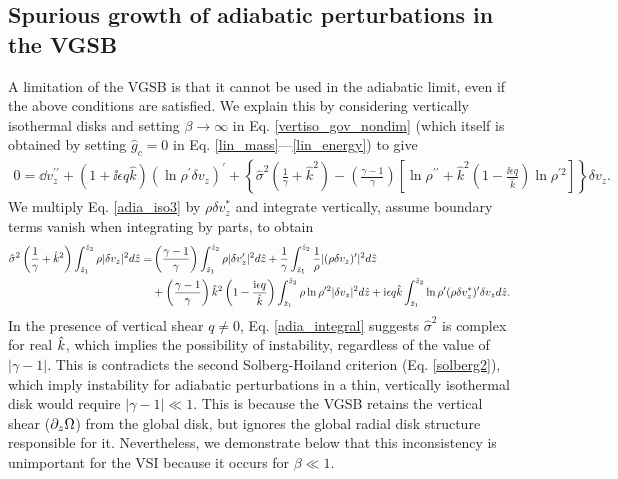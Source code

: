 \subsection{Spurious growth of adiabatic perturbations in the VGSB}\label{analytic_adia} 
A limitation of the VGSB is that it cannot be used in the
adiabatic limit, even if the above conditions are satisfied. We explain this by considering vertically isothermal
disks and setting  $\beta\to\infty$ in 
Eq. \ref{vertiso_gov_nondim} (which itself is obtained by setting
$\hat{g}_c=0$ in Eq. \ref{lin_mass}---\ref{lin_energy}) to give 
\begin{align}
  0 =\dd v_z^{\prime\prime} + \left(1 + \ii \epsilon q
    \hat{k}\right)\left(\ln\rho^{\prime}\delta v_z\right)^\prime
  +\left\{\hat{\sigma}^2\left(\frac{1}{\gamma}+\hat{k}^2\right) 
    -\left(\frac{\gamma-1}{\gamma}\right)\left[\ln\rho^{\prime\prime}+\hat{k}^2\left(1-\frac{\ii\epsilon  
          q}{\hat{k}}\right)\ln\rho^{\prime 2}\right]\right\}\delta v_z.\label{adia_iso3}
\end{align}
We multiply Eq. \ref{adia_iso3} by $\rho\delta v_z^*$ and
integrate vertically, assume boundary terms vanish when integrating by
parts, to obtain
\begin{align}
  \hat{\sigma}^2\left(\frac{1}{\gamma} +
    \hat{k}^2\right)\int_{\hat{z}_1}^{\hat{z}_2}\rho|\delta
  v_z|^2 d\hat{z} 
  =&  \left(\frac{\gamma-1}{\gamma}\right)
  \int_{\hat{z}_1}^{\hat{z}_2}\rho|\delta v_z^\prime|^2 d\hat{z}
  +\frac{1}{\gamma}\int_{\hat{z}_1}^{\hat{z}_2}\frac{1}{\rho}|(\rho\delta
  v_z)^\prime|^2 d\hat{z}\notag\\
&+
  \left(\frac{\gamma-1}{\gamma}\right)\hat{k}^2\left(1-\frac{\mathrm{i}\epsilon
      q}{\hat{k}}\right) \int_{\hat{z}_1}^{\hat{z}_2}\rho\ln\rho^{\prime
    2}|\delta v_z|^2 d\hat{z}
+ \mathrm{i}\epsilon q \hat{k}
  \int_{\hat{z}_1}^{\hat{z}_2}\ln\rho^\prime(\rho\delta v_z^*)^\prime
  \delta v_z d\hat{z}.\label{adia_integral}
\end{align}
In the presence of vertical shear $q\neq0$, Eq. \ref{adia_integral}
suggests $\hat{\sigma}^2$ is complex for real $\hat{k}$, which implies the
possibility of instability, regardless of the value of
$|\gamma-1|$. This is contradicts the second Solberg-Hoiland criterion 
(Eq. \ref{solberg2}), which imply instability for adiabatic
perturbations in a thin, vertically isothermal disk would require 
$|\gamma-1|\ll1$. 
This is because the VGSB retains the vertical shear
($\partial_z\Omega$) from the global disk, but ignores the global radial
disk structure responsible for it. Nevertheless, we demonstrate below
that this inconsistency is unimportant for the VSI because it occurs
for $\beta\ll1$.   %

